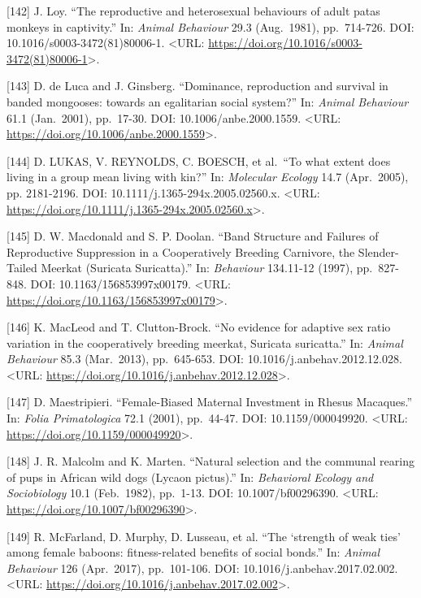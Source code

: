 \documentclass[
]{article}
\begin{document}
{[}142{]} J. Loy. ``The reproductive and heterosexual behaviours of
adult patas monkeys in captivity.'' In: \emph{Animal Behaviour} 29.3
(Aug.~1981), pp.~714-726. DOI: 10.1016/s0003-3472(81)80006-1.
\textless URL:
\url{https://doi.org/10.1016/s0003-3472(81)80006-1}\textgreater.

{[}143{]} D. de Luca and J. Ginsberg. ``Dominance, reproduction and
survival in banded mongooses: towards an egalitarian social system?''
In: \emph{Animal Behaviour} 61.1 (Jan.~2001), pp.~17-30. DOI:
10.1006/anbe.2000.1559. \textless URL:
\url{https://doi.org/10.1006/anbe.2000.1559}\textgreater.

{[}144{]} D. LUKAS, V. REYNOLDS, C. BOESCH, et al.~``To what extent does
living in a group mean living with kin?'' In: \emph{Molecular Ecology}
14.7 (Apr.~2005), pp. 2181-2196. DOI: 10.1111/j.1365-294x.2005.02560.x.
\textless URL:
\url{https://doi.org/10.1111/j.1365-294x.2005.02560.x}\textgreater.

{[}145{]} D. W. Macdonald and S. P. Doolan. ``Band Structure and
Failures of Reproductive Suppression in a Cooperatively Breeding
Carnivore, the Slender-Tailed Meerkat (Suricata Suricatta).'' In:
\emph{Behaviour} 134.11-12 (1997), pp.~827-848. DOI:
10.1163/156853997x00179. \textless URL:
\url{https://doi.org/10.1163/156853997x00179}\textgreater.

{[}146{]} K. MacLeod and T. Clutton-Brock. ``No evidence for adaptive
sex ratio variation in the cooperatively breeding meerkat, Suricata
suricatta.'' In: \emph{Animal Behaviour} 85.3 (Mar.~2013), pp.~645-653.
DOI: 10.1016/j.anbehav.2012.12.028. \textless URL:
\url{https://doi.org/10.1016/j.anbehav.2012.12.028}\textgreater.

{[}147{]} D. Maestripieri. ``Female-Biased Maternal Investment in Rhesus
Macaques.'' In: \emph{Folia Primatologica} 72.1 (2001), pp.~44-47. DOI:
10.1159/000049920. \textless URL:
\url{https://doi.org/10.1159/000049920}\textgreater.

{[}148{]} J. R. Malcolm and K. Marten. ``Natural selection and the
communal rearing of pups in African wild dogs (Lycaon pictus).'' In:
\emph{Behavioral Ecology and Sociobiology} 10.1 (Feb.~1982), pp.~1-13.
DOI: 10.1007/bf00296390. \textless URL:
\url{https://doi.org/10.1007/bf00296390}\textgreater.

{[}149{]} R. McFarland, D. Murphy, D. Lusseau, et al. ``The `strength of
weak ties' among female baboons: fitness-related benefits of social
bonds.'' In: \emph{Animal Behaviour} 126 (Apr.~2017), pp.~101-106. DOI:
10.1016/j.anbehav.2017.02.002. \textless URL:
\url{https://doi.org/10.1016/j.anbehav.2017.02.002}\textgreater.
\end{document}
